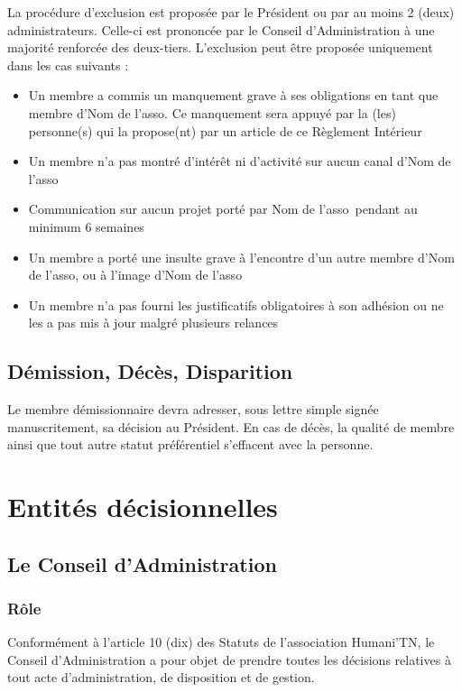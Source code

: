 \documentclass[12pt]{article}
\newcommand{\asso}{Nom de l'asso}
\begin{document}
La procédure d’exclusion est proposée par le Président ou par au moins 2 (deux) administrateurs.
Celle-ci est prononcée par le Conseil d’Administration à une majorité renforcée des deux-tiers.
L’exclusion peut être proposée uniquement dans les cas suivants :
\begin{itemize}
	\item Un membre a commis un manquement grave à ses obligations en tant que membre d’\asso. Ce
manquement sera appuyé par la (les) personne(s) qui la propose(nt) par un article de ce Règlement
Intérieur
	\item Un membre n’a pas montré d’intérêt ni d’activité sur aucun canal d’\asso
	\item Communication sur aucun projet porté par \asso~pendant au minimum 6 semaines
	\item Un membre a porté une insulte grave à l’encontre d’un autre membre d’\asso, ou à l’image
d’\asso
	\item Un membre n’a pas fourni les justificatifs obligatoires à son adhésion ou ne les a pas mis à jour malgré
plusieurs relances
\end{itemize}


\subsection{Démission, Décès, Disparition}
\label{sec:membres:demission}

Le membre démissionnaire devra adresser, sous lettre simple signée manuscritement, sa décision au
Président.
En cas de décès, la qualité de membre ainsi que tout autre statut préférentiel s’effacent avec la personne.

\section{Entités décisionnelles}
\label{sec:entites_decisionnelles}

\subsection{Le Conseil d’Administration}
\label{sec:entites_decisionnelles:conseil_admin}

\subsubsection{Rôle}
\label{sec:entites_decisionnelles:conseil_admin:role}

Conformément à l’article 10 (dix) des Statuts de l’association Humani'TN, le Conseil d’Administration a pour
objet de prendre toutes les décisions relatives à tout acte d’administration, de disposition et de gestion.
\end{document}
